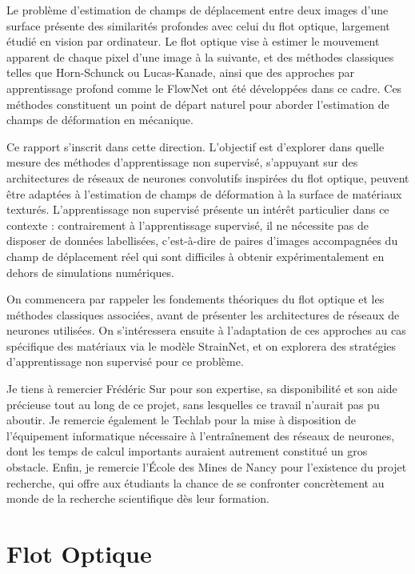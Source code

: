 \documentclass{magnolia}
\begin{document}
Le problème d'estimation de champs de déplacement entre deux images d'une surface présente des similarités profondes avec celui du flot optique, largement étudié en vision par ordinateur. Le flot optique vise à estimer le mouvement apparent de chaque pixel d'une image à la suivante, et des méthodes classiques telles que Horn-Schunck ou Lucas-Kanade, ainsi que des approches par apprentissage profond comme le FlowNet ont été développées dans ce cadre. Ces méthodes constituent un point de départ naturel pour aborder l'estimation de champs de déformation en mécanique.

Ce rapport s'inscrit dans cette direction. L'objectif est d'explorer dans quelle mesure des méthodes d'apprentissage non supervisé, s'appuyant sur des architectures de réseaux de neurones convolutifs inspirées du flot optique, peuvent être adaptées à l'estimation de champs de déformation à la surface de matériaux texturés. L'apprentissage non supervisé présente un intérêt particulier dans ce contexte : contrairement à l'apprentissage supervisé, il ne nécessite pas de disposer de données labellisées, c'est-à-dire de paires d'images accompagnées du champ de déplacement réel qui sont difficiles à obtenir expérimentalement en dehors de simulations numériques.

On commencera par rappeler les fondements théoriques du flot optique et les méthodes classiques associées, avant de présenter les architectures de réseaux de neurones utilisées. On s'intéressera ensuite à l'adaptation de ces approches au cas spécifique des matériaux via le modèle StrainNet, et on explorera des stratégies d'apprentissage non supervisé pour ce problème.

\vspace{1cm}

Je tiens à remercier Frédéric Sur pour son expertise, sa disponibilité et son aide précieuse tout au long de ce projet, sans lesquelles ce travail n'aurait pas pu aboutir. Je remercie également le Techlab pour la mise à disposition de l'équipement informatique nécessaire à l'entraînement des réseaux de neurones, dont les temps de calcul importants auraient autrement constitué un gros obstacle. Enfin, je remercie l'École des Mines de Nancy pour l'existence du projet recherche, qui offre aux étudiants la chance de se confronter concrètement au monde de la recherche scientifique dès leur formation.

\section{Flot Optique}
\end{document}
